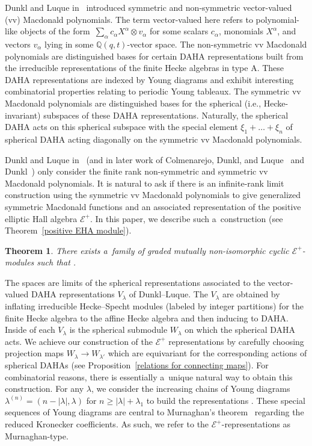 \documentclass[pdftex]{sigma}
\numberwithin{equation}{section}
\newtheorem{Theorem}{Theorem}[section]
\theoremstyle{definition}
\DeclareMathOperator{\Par}{\mathbb{Y}}
\begin{document}
Dunkl and Luque in~\cite{DL_2011} introduced symmetric and non-symmetric vector-valued (vv) Macdonald polynomials. The term vector-valued here refers to polynomial-like objects of the form~${\sum_{\alpha}c_{\alpha}X^{\alpha}\otimes v_{\alpha}}$ for some scalars $c_{\alpha}$, monomials $X^{\alpha}$, and vectors $v_{\alpha}$ lying in some $\mathbb{Q}(q,t)$-vector space. The non-symmetric vv Macdonald polynomials are distinguished bases for certain DAHA representations built from the irreducible representations of the finite Hecke algebras in type A. These DAHA representations are indexed by Young diagrams and exhibit interesting combinatorial properties relating to periodic Young tableaux. The symmetric vv Macdonald polynomials are distinguished bases for the spherical (i.e., Hecke-invariant) subspaces of these DAHA representations. Naturally, the spherical DAHA acts on this spherical subspace with the special element $\xi_1+\dots + \xi_n$ of spherical DAHA acting diagonally on the symmetric vv Macdonald polynomials.

Dunkl and Luque in~\cite{DL_2011} (and in later work of Colmenarejo, Dunkl, and Luque~\cite{CDL_2022} and Dunkl~\cite{D_2019}) only consider the finite rank non-symmetric and symmetric vv Macdonald polynomials. It is natural to ask if there is an infinite-rank limit construction using the symmetric vv Macdonald polynomials to give generalized symmetric Macdonald functions and an associated representation of the positive elliptic Hall algebra $\mathcal{E}^{+}$. In this paper, we describe such a~construction (see Theorem~\ref{positive EHA module}).
\begin{Theorem}
 There exists a~family \smash{$\bigl(\widetilde{W}_{\lambda}\bigr)_{\lambda \in \Par}$} of graded mutually non-isomorphic cyclic $\mathcal{E}^+$-modules such that .
\end{Theorem}
The spaces  are limits of the spherical representations associated to the vector-valued DAHA representations $V_{\lambda}$ of Dunkl--Luque. The $V_{\lambda}$ are obtained by inflating irreducible Hecke--Specht modules (labeled by integer partitions) for the finite Hecke algebra to the affine Hecke algebra and then inducing to DAHA. Inside of each $V_{\lambda}$ is the spherical submodule $W_{\lambda}$ on which the spherical DAHA acts. We achieve our construction of the $\mathcal{E}^{+}$ representations  by carefully choosing projection maps $W_{\lambda} \rightarrow W_{\lambda'}$ which are equivariant for the corresponding actions of spherical DAHAs (see Proposition~\ref{relations for connecting maps}). For combinatorial reasons, there is essentially a~unique natural way to obtain this construction. For any $\lambda$, we consider the increasing chains of Young diagrams $\lambda^{(n)} = (n-|\lambda|,\lambda)$ for $n \geq |\lambda| + \lambda_1$ to build the representations . These special sequences of Young diagrams are central to Murnaghan's theorem~\cite{M_1938} regarding the reduced Kronecker coefficients. As such, we refer to the $\mathcal{E}^{+}$-representations  as Murnaghan-type.
\end{document}
